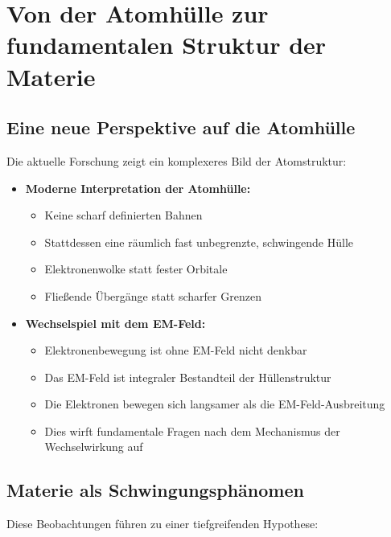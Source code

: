 \documentclass[12pt,a4paper]{article}
\begin{document}
\section{Von der Atomhülle zur fundamentalen Struktur der Materie}

\subsection{Eine neue Perspektive auf die Atomhülle}
Die aktuelle Forschung zeigt ein komplexeres Bild der Atomstruktur:

\begin{itemize}
    \item \textbf{Moderne Interpretation der Atomhülle:}
    \begin{itemize}
        \item Keine scharf definierten Bahnen
        \item Stattdessen eine räumlich fast unbegrenzte, schwingende Hülle
        \item Elektronenwolke statt fester Orbitale
        \item Fließende Übergänge statt scharfer Grenzen
    \end{itemize}

    \item \textbf{Wechselspiel mit dem EM-Feld:}
    \begin{itemize}
        \item Elektronenbewegung ist ohne EM-Feld nicht denkbar
        \item Das EM-Feld ist integraler Bestandteil der Hüllenstruktur
        \item Die Elektronen bewegen sich langsamer als die EM-Feld-Ausbreitung
        \item Dies wirft fundamentale Fragen nach dem Mechanismus der Wechselwirkung auf
    \end{itemize}
\end{itemize}

\subsection{Materie als Schwingungsphänomen}
Diese Beobachtungen führen zu einer tiefgreifenden Hypothese:
\end{document}
